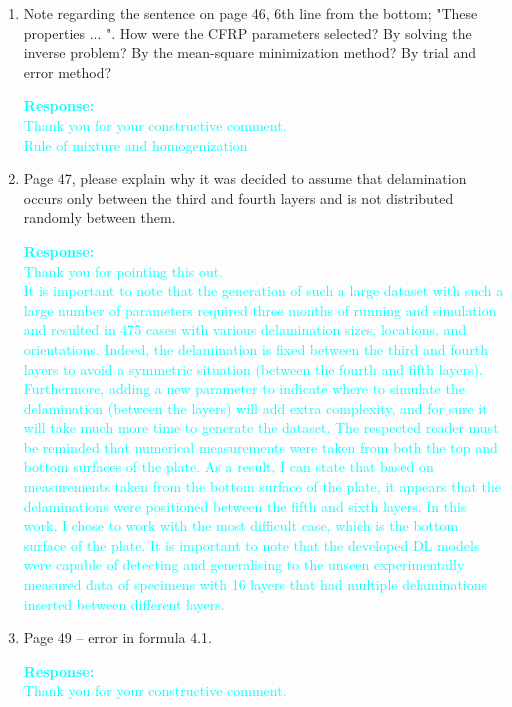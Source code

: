 \documentclass[11pt,a2paper]{report}
\begin{document}
{\begin{enumerate}
		\item Note regarding the sentence on page 46, 6th line from the bottom; "These properties ... ". 
		How were the CFRP parameters selected? By solving the inverse problem? By the mean-square minimization method? By trial and error method?
		
		\textcolor{Cyan}{
			\textbf{Response:}\\
			Thank you for your constructive comment. \\
			Rule of mixture and homogenization
			}	
		
		\item Page 47, please explain why it was decided to assume that delamination occurs only between the third and fourth layers and is not distributed randomly between them.
				
		\textcolor{Cyan}{
			\textbf{Response:} \\
			Thank you for pointing this out. \\
			It is important to note that the generation of such a large dataset with such a large number of parameters required three months of running and simulation and resulted in 475 cases with various delamination sizes, locations, and orientations.
			Indeed, the delamination is fixed between the third and fourth layers to avoid a symmetric situation (between the fourth and fifth layers).
			Furthermore, adding a new parameter to indicate where to simulate the delamination (between the layers) will add extra complexity, and for sure it will take much more time to generate the dataset.
			The respected reader must be reminded that numerical measurements were taken from both the top and bottom surfaces of the plate.
			As a result, I can state that based on measurements taken from the bottom surface of the plate, it appears that the delaminations were positioned between the fifth and sixth layers.
			In this work, I chose to work with the most difficult case, which is the bottom surface of the plate.
			It is important to note that the developed DL models were capable of detecting and generalising to the unseen experimentally measured data of specimens with 16 layers that had multiple delaminations inserted between different layers.
		}
	
		\item Page 49 – error in formula 4.1.
		
		\textcolor{Cyan}{
			\textbf{Response:} \\
			Thank you for your constructive comment. \\
		}		
	

\end{enumerate}}
\end{document}
